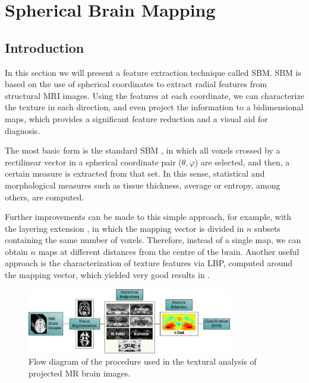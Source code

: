\chapter{Spherical Brain Mapping}\label{ch:sbm}
\section{Introduction}
In this section we will present a feature extraction technique called \acf{SBM}. \ac{SBM} is based on the use of spherical coordinates to extract radial features from structural \ac{MRI} images. Using the features at each coordinate, we can characterize the texture in each direction, and even project the information to a bidimensional maps, which provides a significant feature reduction and a visual aid for diagnosis. 

The most basic form is the standard \ac{SBM} \cite{Martinez-Murcia2014225,Martinez-Murcia2015}, in which all voxels crossed by a rectilinear vector in a spherical coordinate pair ($\theta,\varphi$) are selected, and then, a certain measure is extracted from that set. In this sense, statistical and morphological measures such as tissue thickness, average or entropy, among others, are computed. 

Further improvements can be made to this simple approach, for example, with the layering extension \cite{Martinez-Murcia2015}, in which the mapping vector is divided in $n$ subsets containing the same number of voxels. Therefore, instead of a single map, we can obtain $n$ maps at different distances from the centre of the brain. Another useful approach is the characterization of texture features via \acf{LBP}, computed around the mapping vector, which yielded very good results in \cite{Martinez-MurciaVRLBP}.

\begin{figure}[htp]
	\centering
	\includegraphics[width=0.8\textwidth]{Graphics/ch6/01-flowdiagram}
	\caption{Flow diagram of the procedure used in the textural analysis of projected MR brain images.}
	\label{fig:flowdiagram}
\end{figure}

